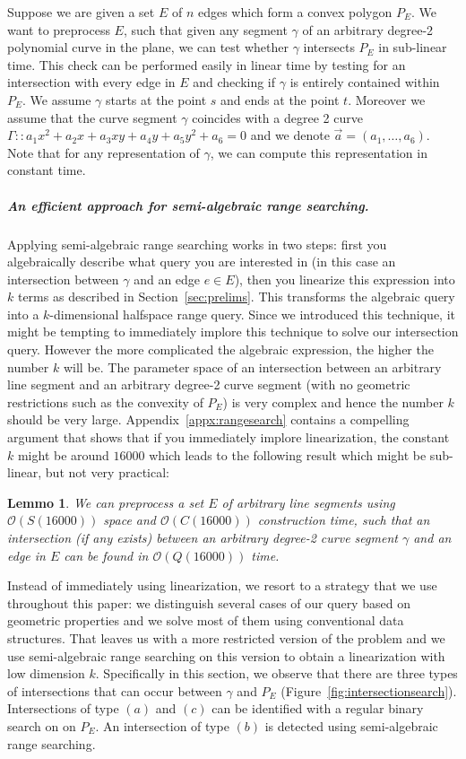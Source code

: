 \documentclass[a4paper, UKenglish]{paper}
\newtheorem{lemma}{Lemmo}
\begin{document}
Suppose we are given a set $E$ of $n$ edges which form a convex polygon $P_E$. We want to preprocess $E$, such that given any segment $\gamma$ of an arbitrary degree-2 polynomial curve in the plane, we can test whether $\gamma$ intersects $P_E$ in sub-linear time. This check can be performed easily in linear time by testing for an intersection with every edge in $E$ and checking if $\gamma$ is entirely contained within $P_E$. We assume $\gamma$ starts at the point $s$ and ends at the point $t$. Moreover we assume that the curve segment $\gamma$ coincides with a degree 2 curve $\Gamma :: a_1 x^2 + a_2 x + a_3 xy + a_4 y + a_5 y^2 + a_6 = 0$ and we denote $\vec{a} = (a_1, \ldots, a_6)$. Note that for any representation of $\gamma$, we can compute this representation in constant time.

\subparagraph*{An efficient approach for semi-algebraic range searching.}
Applying semi-algebraic range searching works in two steps: first you algebraically describe what query you are interested in (in this case an intersection between $\gamma$ and an edge $e \in E$), then you linearize this expression into $k$ terms as described in Section~\ref{sec:prelims}. This transforms the algebraic query into a $k$-dimensional halfspace range query. Since we introduced this technique, it might be tempting to immediately implore this technique to solve our intersection query. However the more complicated the algebraic expression, the higher the number $k$ will be. The parameter space of an intersection between an arbitrary line segment and an arbitrary degree-2 curve segment (with no geometric restrictions such as the convexity of $P_E$) is very complex and hence the number $k$ should be very large. Appendix~\ref{appx:rangesearch} contains a compelling argument that shows that if you immediately implore linearization, the constant $k$ might be around $16000$ which leads to the following result which might be sub-linear, but not very practical:

\begin{lemma}
We can preprocess a set $E$ of \emph{arbitrary} line segments using $\mathcal{O}(S(16000))$ space and $\mathcal{O}(C(16000))$ construction time, such that an intersection (if any exists) between an arbitrary degree-2 curve segment $\gamma$ and an edge in $E$ can be found in $\mathcal{O}(Q(16000))$ time.
\end{lemma}

 \noindent
Instead of immediately using linearization, we resort to a strategy that we use throughout this paper: we distinguish several cases of our query based on geometric properties and we solve most of them using conventional data structures. That leaves us with a more restricted version of the problem and we use semi-algebraic range searching on this version to obtain a linearization with low dimension $k$. 
Specifically in this section, we observe that there are three types of intersections that can occur between $\gamma$ and $P_E$ (Figure~\ref{fig:intersectionsearch}). Intersections of type $(a)$ and $(c)$ can be identified with a regular binary search on on $P_E$. An intersection of type $(b)$ is detected using semi-algebraic range searching.
\end{document}

